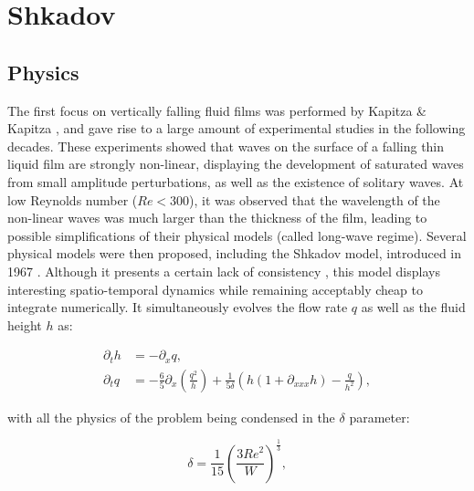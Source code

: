\chapter{Shkadov}

\section{Physics}

The first focus on vertically falling fluid films was performed by Kapitza \& Kapitza \cite{kapitza1948}, and gave rise to a large amount of experimental studies in the following decades. These experiments showed that waves on the surface of a falling thin liquid film are strongly non-linear, displaying the development of saturated waves from small amplitude perturbations, as well as the existence of solitary waves. At low Reynolds number ($Re < 300$), it was observed that the wavelength of the non-linear waves was much larger than the thickness of the film, leading to possible simplifications of their physical models (called long-wave regime). Several physical models were then proposed, including the Shkadov model, introduced in 1967 \cite{shkadov1967}. Although it presents a certain lack of consistency \cite{lavalle2014}, this model displays interesting spatio-temporal dynamics while remaining acceptably cheap to integrate numerically. It simultaneously evolves the flow rate $q$ as well as the fluid height $h$ as:

\begin{equation}
\label{eq:shkadov}
\begin{split}
	\partial_t h 	&= -\partial_x q, \\
	\partial_t q		&= - \frac{6}{5} \partial_x \left( \frac{q^2}{h} \right) + \frac{1}{5 \delta} \left(  h \left( 1 + \partial_{xxx}h \right) - \frac{q}{h^2} \right),
\end{split}
\end{equation}

\noindent with all the physics of the problem being condensed in the $\delta$ parameter:

\begin{equation}
\label{eq:shkadov_delta}
	\delta = \frac{1}{15} \left( \frac{3 {Re}^2}{W} \right)^{\frac{1}{3}},
\end{equation}

